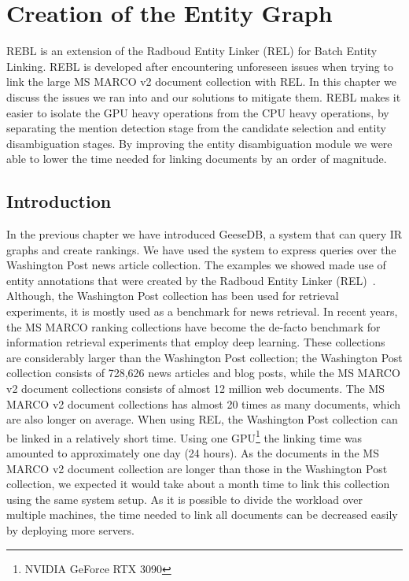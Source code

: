 \chapter{Creation of the Entity Graph}
\label{a-graph-of-entities}

\begin{Abstract}
	\begin{changemargin}{1cm}{1cm}
		REBL is an extension of the Radboud Entity Linker (REL) for Batch Entity Linking. 
		REBL is developed after encountering unforeseen issues when trying to link the large MS MARCO v2 document collection with REL. In this chapter we discuss the issues we ran into and our solutions to mitigate them. REBL makes it easier to isolate the GPU heavy operations from the CPU heavy operations, by separating the mention detection stage from the candidate selection and entity disambiguation stages. By improving the entity disambiguation module we were able to lower the time needed for linking documents by an order of magnitude.
	\end{changemargin}
\end{Abstract}

\section{Introduction}
In the previous chapter we have introduced GeeseDB, a system that can query IR graphs and create rankings. We have used the system to express queries over the Washington Post news article collection. The examples we showed made use of entity annotations that were created by the Radboud Entity Linker (REL)~\citep{rel}.
Although, the Washington Post collection has been used for retrieval experiments, it is mostly used as a benchmark for news retrieval. 
In recent years, the MS MARCO ranking collections have become the de-facto benchmark for information retrieval experiments that employ deep learning. These collections are considerably larger than the Washington Post collection; the Washington Post collection consists of 728,626 news articles and blog posts, while the MS MARCO v2 document collections consists of almost 12 million web documents. The MS MARCO v2 document collections has almost 20 times as many documents, which are also longer on average.
When using REL, the Washington Post collection can be linked in a relatively short time. Using one GPU\footnote{NVIDIA GeForce RTX 3090} the linking time was amounted to approximately one day (24 hours). As the documents in the MS MARCO v2 document collection are longer than those in the Washington Post collection, we expected it would take about a month time to link this collection using the same system setup. As it is possible to divide the workload over multiple machines, the time needed to link all documents can be decreased easily by deploying more servers. 

